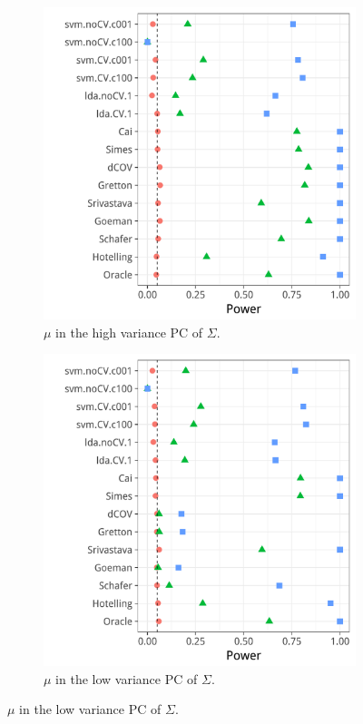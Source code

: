 \documentclass[journal]{IEEEtran}
\begin{document}
\begin{figure}[h]
	\centering
	\caption{Heteroskedasticity: $\Sigma$ is diagonal with $\Sigma_{jj}=j$.}	
	\label{fig:heteroskedastic}	
	\begin{subfigure}[t]{.45\columnwidth}
		\centering
		\includegraphics[width=1\columnwidth]{"art/file26"}
		\caption{$\mu$ in the high variance PC of $\Sigma$.}  
		\label{fig:heteroskedastic_11}	
	\end{subfigure}
	\begin{subfigure}[t]{0.45\columnwidth}
		\centering
		\includegraphics[width=1\columnwidth]{"art/file24"}
		\caption{$\mu$ in the low variance PC of $\Sigma$.}  
		\label{fig:heteroskedastic_12}	
	\end{subfigure}
\end{figure}
\end{document}
